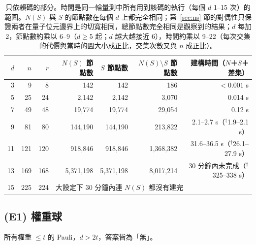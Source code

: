 \documentclass[a4paper,11pt,fontset=none]{ctexart}
\theoremstyle{definition}
\begin{document}
\begin{table}[H]
\centering
\small
\begin{tabular}{@{}rrrrrrr@{}}
\toprule
$d$ & $n$ & $r$ & $N(S)$ 節點數 & $S$ 節點數 & $N(S)\setminus S$ 節點數 & 建構時間（$N$＋$S$＋差集）\\
\midrule
3  & 9   & 8   & 142 & 142 & 186 & $<0.001$ s\\
5  & 25  & 24  & 2,142 & 2,142 & 3,070 & 0.014 s\\
7  & 49  & 48  & 19,774 & 19,774 & 29,054 & 0.12 s\\
9  & 81  & 80  & 144,190 & 144,190 & 213,822 & 2.1--2.7 s（$^\dagger$1.9--2.1 s）\\
11 & 121 & 120 & 918,846 & 918,846 & 1,368,382 & 31.6--36.5 s（$^\dagger$26.1--27.9 s）\\
13 & 169 & 168 & 5,371,198 & 5,371,198 & 8,017,214 & 30 分鐘內未完成（$^\dagger$325--338 s）\\
15 & 225 & 224 & \multicolumn{4}{l}{大設定下 30 分鐘內連 $N(S)$ 都沒有建完}\\
\bottomrule
\end{tabular}
\caption{只依賴碼的部分。時間是同一輪量測中所有用到該碼的執行（每個 $d$ 1--15 次）的範圍。$N(S)$ 與 $S$ 的節點數在每個 $d$ 上都完全相同；第~\ref{sec:ns} 節的對偶性只保證兩者在量子位元邊界上的切寬相同，總節點數完全相同是觀察到的結果；$d$ 每加 2，節點數約乘以 6--9（$d\ge5$ 起；$d$ 越大越接近 6），時間約乘以 9--22（每次交集的代價與當時的圖大小成正比，交集次數又與 $n$ 成正比）。}\label{tab:code}
\end{table}

\subsection{(E1) 權重球}

所有權重 $\le t$ 的 Pauli，$d>2t$，答案皆為「無」。
\end{document}
